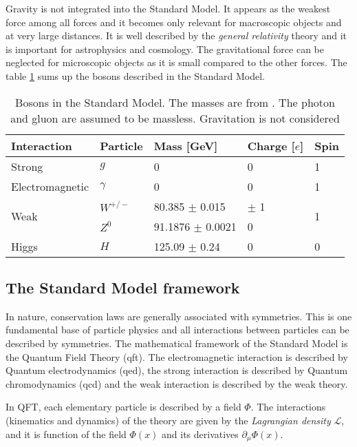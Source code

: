 Gravity is not integrated into the Standard Model. It appears as the weakest force among all forces and it becomes only relevant for macroscopic objects and at very large distances. It is well described by the \textit{general relativity} theory \cite{Einstein:1905ve} and it is important for astrophysics and cosmology. The gravitational force can be neglected for microscopic objects as it is small compared to the other forces. The table \ref{table:Bosons} sums up the bosons described in the Standard Model.

\begin{table}[htb!]
  \centering
  \caption{Bosons in the Standard Model. The masses are from \cite{Patrignani:2016xqp}. The photon and gluon are assumed to be massless. Gravitation is not considered}
  \label{table:Bosons}
  \begin{tabular}{lllll}
    \hline
    Interaction & Particle & Mass [GeV] & Charge [$e$] & Spin\\
    \hline
    Strong & $g$ & 0 & 0 & 1\\
    Electromagnetic & $\gamma$ & 0 & 0 & 1\\
    \multirow{2}{*}{Weak} & $W^{+/-}$ & 80.385 $\pm$ 0.015 & $\pm$ 1 & \multirow{2}{*}{1}\\
    & $Z^0$ & 91.1876 $\pm$ 0.0021 & 0 &\\
    Higgs & $H$ & 125.09 $\pm$ 0.24 & 0 & 0\\
    \hline
  \end{tabular}
\end{table}

\subsection{The Standard Model framework}

In nature, conservation laws are generally associated with symmetries. This is one fundamental base of particle physics and all interactions between particles can be described by symmetries. The mathematical framework of the Standard Model is the Quantum Field Theory (\acrshort{qft}). The electromagnetic interaction is described by Quantum electrodynamics (\acrshort{qed}), the strong interaction is described by Quantum chromodynamics (\acrshort{qcd}) and the weak interaction is described by the weak theory.

In QFT, each elementary particle is described by a field $\Phi$. The interactions (kinematics and dynamics) of the theory are given by the \textit{Lagrangian density} $\mathcal{L}$, and it is function of the field $\Phi(x)$ and its derivatives $\partial_{\mu}\Phi(x)$.

